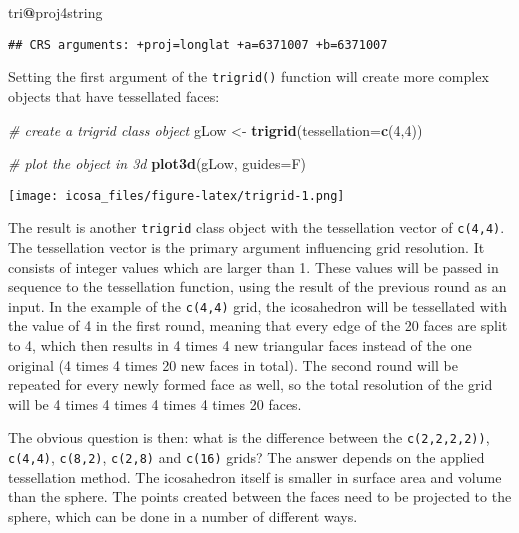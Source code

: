 \documentclass[]{article}
\newenvironment{Shaded}{\begin{snugshade}}{\end{snugshade}}
\newcommand{\KeywordTok}[1]{\textcolor[rgb]{0.13,0.29,0.53}{\textbf{#1}}}
\newcommand{\DataTypeTok}[1]{\textcolor[rgb]{0.13,0.29,0.53}{#1}}
\newcommand{\DecValTok}[1]{\textcolor[rgb]{0.00,0.00,0.81}{#1}}
\newcommand{\StringTok}[1]{\textcolor[rgb]{0.31,0.60,0.02}{#1}}
\newcommand{\CommentTok}[1]{\textcolor[rgb]{0.56,0.35,0.01}{\textit{#1}}}
\newcommand{\OperatorTok}[1]{\textcolor[rgb]{0.81,0.36,0.00}{\textbf{#1}}}
\newcommand{\NormalTok}[1]{#1}
\begin{document}
\begin{Shaded}
\begin{Highlighting}[]
\NormalTok{tri}\OperatorTok{@}\NormalTok{proj4string}
\end{Highlighting}
\end{Shaded}

\begin{verbatim}
## CRS arguments: +proj=longlat +a=6371007 +b=6371007
\end{verbatim}

Setting the first argument of the \texttt{trigrid()} function will
create more complex objects that have tessellated faces:

\begin{Shaded}
\begin{Highlighting}[]
\CommentTok{# create a trigrid class object}
\NormalTok{gLow <-}\StringTok{ }\KeywordTok{trigrid}\NormalTok{(}\DataTypeTok{tessellation=}\KeywordTok{c}\NormalTok{(}\DecValTok{4}\NormalTok{,}\DecValTok{4}\NormalTok{))}

\CommentTok{# plot the object in 3d}
\KeywordTok{plot3d}\NormalTok{(gLow, }\DataTypeTok{guides=}\NormalTok{F)}
\end{Highlighting}
\end{Shaded}

\texttt{[image: icosa\_files/figure-latex/trigrid-1.png]}

The result is another \texttt{trigrid} class object with the
tessellation vector of \texttt{c(4,4)}. The tessellation vector is the
primary argument influencing grid resolution. It consists of integer
values which are larger than 1. These values will be passed in sequence
to the tessellation function, using the result of the previous round as
an input. In the example of the \texttt{c(4,4)} grid, the icosahedron
will be tessellated with the value of 4 in the first round, meaning that
every edge of the 20 faces are split to 4, which then results in 4 times
4 new triangular faces instead of the one original (4 times 4 times 20
new faces in total). The second round will be repeated for every newly
formed face as well, so the total resolution of the grid will be 4 times
4 times 4 times 4 times 20 faces.

The obvious question is then: what is the difference between the
\texttt{c(2,2,2,2))}, \texttt{c(4,4)}, \texttt{c(8,2)}, \texttt{c(2,8)}
and \texttt{c(16)} grids? The answer depends on the applied tessellation
method. The icosahedron itself is smaller in surface area and volume
than the sphere. The points created between the faces need to be
projected to the sphere, which can be done in a number of different
ways.
\end{document}
